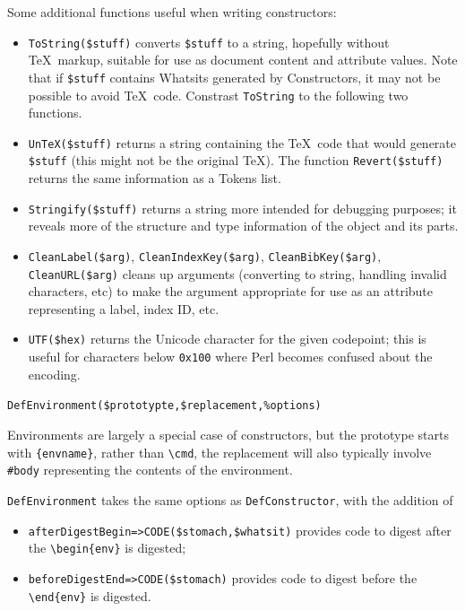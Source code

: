 \documentclass{book}
\newcommand{\ltxcode}{\lstinline[style=latexml]}
\begin{document}
Some additional functions useful when writing constructors:
\begin{itemize}
\item \ltxcode|ToString($stuff)| converts \ltxcode|$stuff| to a string,
  hopefully without \TeX\ markup, suitable for use as document content
  and attribute values.  Note that if \ltxcode|$stuff| contains Whatsits
  generated by Constructors, it may not be possible to avoid \TeX\ code.
  Constrast \ltxcode|ToString| to the following two functions.
\item \ltxcode|UnTeX($stuff)| returns a string containing the \TeX\ code
  that would generate \ltxcode|$stuff| (this might not be the original \TeX).
  The function \ltxcode|Revert($stuff)| returns the same information as a Tokens list.
\item \ltxcode|Stringify($stuff)| returns a string more intended
  for debugging purposes; it reveals more of the structure and type information
  of the object and its parts.
\item \ltxcode|CleanLabel($arg)|,
   \ltxcode|CleanIndexKey($arg)|,
   \ltxcode|CleanBibKey($arg)|,
   \ltxcode|CleanURL($arg)|
  cleans up arguments (converting to string, handling invalid characters, etc)
  to make the argument appropriate for use as an attribute representing
  a label, index ID, etc.
\item \ltxcode|UTF($hex)| returns the Unicode character for the given
codepoint; this is useful for characters below \texttt{0x100} where
Perl becomes confused about the encoding.
\end{itemize}

\par\noindent \ltxcode|DefEnvironment($prototypte,$replacement,%
\par Environments are largely a special case of constructors,
but the prototype starts with \verb|{envname}|, rather than \verb|\cmd|,
the replacement will also typically involve \verb|#body| representing
the contents of the environment.

\texttt{DefEnvironment} takes the same options as  \texttt{DefConstructor},
with the addition of
\begin{itemize}
\item \ltxcode|afterDigestBegin=>CODE($stomach,$whatsit)|
provides code to digest after the \verb|\begin{env}| is digested;
\item \ltxcode|beforeDigestEnd=>CODE($stomach)|
provides code to digest before the \verb|\end{env}| is digested.
\end{itemize}
\end{document}
